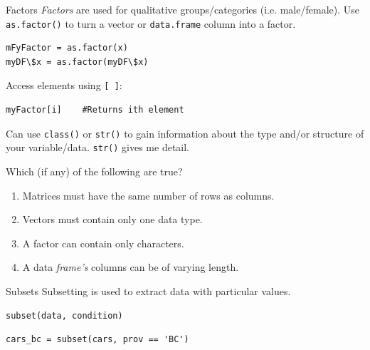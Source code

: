 \documentclass[xcolor=svgnames, 10pt, handout]{beamer}
\begin{document}
\begin{frame}[fragile]{Factors}
\emph{Factors} are used for qualitative groups/categories (i.e. male/female).  Use \verb|as.factor()| to turn a vector or \verb|data.frame| column into a factor.
\vfill
\begin{Verbatim}[commandchars=\\\{\}, xleftmargin=2em]
mFyFactor = as.factor(x)
myDF\$x = as.factor(myDF\$x)
\end{Verbatim}
\vfill
Access elements using \verb|[ ]|:
\begin{Verbatim}[commandchars=\\\{\}, xleftmargin=2em]
myFactor[i]    #Returns ith element
\end{Verbatim}
\vfill
Can use \verb|class()| or \verb|str()| to gain information about the type and/or structure of your variable/data. \verb|str()|  gives me detail.
\vfill
\end{frame}


\begin{frame}[fragile]
\begin{question}
Which (if any) of the following are true?
\begin{enumerate}
\item Matrices must have the same number of rows as columns. \onslide<+-> \pxmark
\item Vectors must contain only one data type. \pxmark
\item A factor can contain only characters.
\item A data \emph{frame's} columns can be of varying length. \pxmark
\end{enumerate}
\end{question}
\end{frame}


\begin{frame}[fragile]{Subsets}
Subsetting is used to extract data with particular values.
\vfill
\begin{Verbatim}[xleftmargin=2em, xrightmargin=1.5em, frame=single, label=Syntax in R, framesep=0.5em]
subset(data, condition)
\end{Verbatim}
\vfill
\begin{Verbatim}[xleftmargin=2em, xrightmargin=1.5em, frame=single, label=Example in R, framesep=0.5em]
cars_bc = subset(cars, prov == 'BC')
\end{Verbatim}
\vfill
\end{frame}
\end{document}
